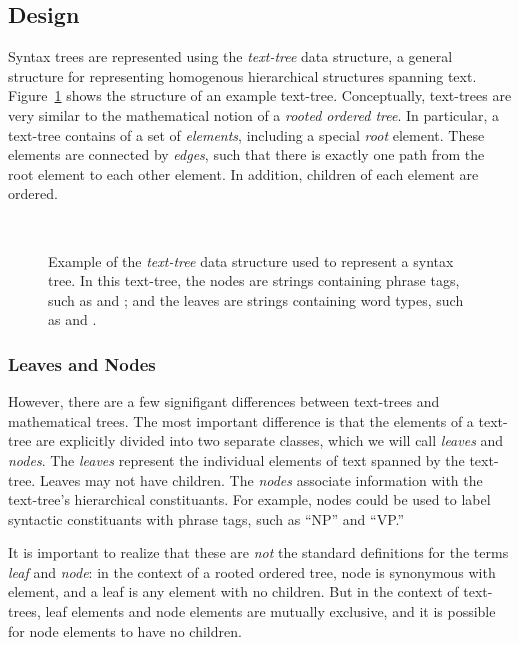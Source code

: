 \documentclass[11pt]{article}
\begin{document}
\subsection{Design}

  Syntax trees are represented using the \emph{text-tree} data
  structure, a general structure for representing homogenous
  hierarchical structures spanning text.  Figure~\ref{fig:tree} shows
  the structure of an example text-tree.  Conceptually, text-trees are
  very similar to the mathematical notion of a \emph{rooted ordered
  tree}.  In particular, a text-tree contains of a set of
  \emph{elements}, including a special \emph{root} element.  These
  elements are connected by \emph{edges}, such that there is exactly
  one path from the root element to each other element.  In addition,
  children of each element are ordered.

  \begin{figure}
  \begin{centering}
    \\
  \end{centering}

   \caption{Example of the \emph{text-tree} data structure used to
   represent a syntax tree.  In this text-tree, the nodes are strings
   containing phrase tags, such as  and ; and the
   leaves are strings containing word types, such as  and
   .}

  \label{fig:tree}
  \end{figure}

\subsubsection{Leaves and Nodes}
  However, there are a few signifigant differences between text-trees
  and mathematical trees.  The most important difference is that the
  elements of a text-tree are explicitly divided into two separate
  classes, which we will call \emph{leaves} and \emph{nodes}.  The
  \emph{leaves} represent the individual elements of text spanned by
  the text-tree.  Leaves may not have children.  The \emph{nodes}
  associate information with the text-tree's hierarchical
  constituants.  For example, nodes could be used to label syntactic
  constituants with phrase tags, such as ``NP'' and ``VP.''

  It is important to realize that these are \emph{not} the standard
  definitions for the terms \emph{leaf} and \emph{node}: in the
  context of a rooted ordered tree, node is synonymous with element,
  and a leaf is any element with no children.  But in the context of
  text-trees, leaf elements and node elements are mutually exclusive,
  and it is possible for node elements to have no children.
\end{document}
